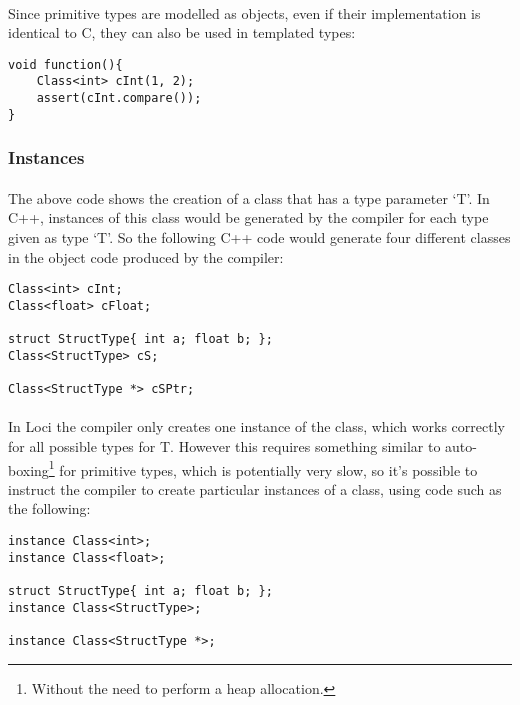 \documentclass[12pt,twoside,notitlepage]{report}
\begin{document}
\paragraph{}
Since primitive types are modelled as objects, even if their implementation is identical to C, they can also be used in templated types:


\begin{lstlisting}
void function(){
	Class<int> cInt(1, 2);
	assert(cInt.compare());
}
\end{lstlisting}


\subsubsection{Instances}

\paragraph{}
The above code shows the creation of a class that has a type parameter `T'. In C++, instances of this class would be generated by the compiler for each type given as type `T'. So the following C++ code would generate four different classes in the object code produced by the compiler:


\begin{lstlisting}
Class<int> cInt;
Class<float> cFloat;

struct StructType{ int a; float b; };
Class<StructType> cS;

Class<StructType *> cSPtr;
\end{lstlisting}


\paragraph{}
In Loci the compiler only creates one instance of the class, which works correctly for all possible types for T. However this requires something similar to auto-boxing\footnote{Without the need to perform a heap allocation.} for primitive types, which is potentially very slow, so it's possible to instruct the compiler to create particular instances of a class, using code such as the following:


\begin{lstlisting}
instance Class<int>;
instance Class<float>;

struct StructType{ int a; float b; };
instance Class<StructType>;

instance Class<StructType *>;
\end{lstlisting}
\end{document}
